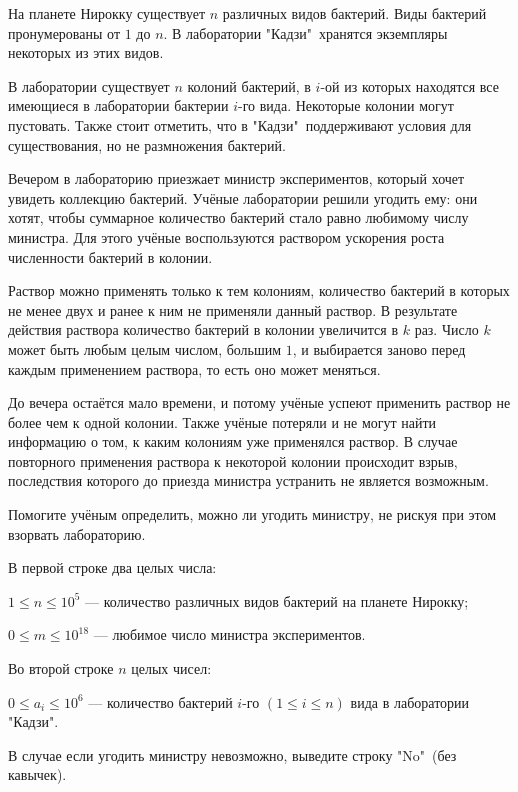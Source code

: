 
На планете Нирокку существует $n$ различных видов бактерий. Виды бактерий пронумерованы от $1$ до $n$. В лаборатории "Кадзи"\ хранятся экземпляры некоторых из этих видов.

В лаборатории существует $n$ колоний бактерий, в $i$-ой из которых находятся все имеющиеся в лаборатории бактерии $i$-го вида. Некоторые колонии могут пустовать. Также стоит отметить, что в "Кадзи"\ поддерживают условия для существования, но не размножения бактерий.

Вечером в лабораторию приезжает министр экспериментов, который хочет увидеть коллекцию бактерий. Учёные лаборатории решили угодить ему: они хотят, чтобы суммарное количество бактерий стало равно любимому числу министра. Для этого учёные воспользуются раствором ускорения роста численности бактерий в колонии.

Раствор можно применять только к тем колониям, количество бактерий в которых не менее двух и ранее к ним не применяли данный раствор. В результате действия раствора количество бактерий в колонии увеличится в $k$ раз. Число $k$ может быть любым целым числом, большим $1$, и выбирается заново перед каждым применением раствора, то есть оно может меняться.

До вечера остаётся мало времени, и потому учёные успеют применить раствор не более чем к одной колонии. Также учёные потеряли и не могут найти информацию о том, к каким колониям уже применялся раствор. В случае повторного применения раствора к некоторой колонии происходит взрыв, последствия которого до приезда министра устранить не является возможным.

Помогите учёным определить, можно ли угодить министру, не рискуя при этом взорвать лабораторию.


В первой строке два целых числа:

$1 \le n \le 10^5$ --- количество различных видов бактерий на планете Нирокку;

$0 \le m \le 10^{18}$ --- любимое число министра экспериментов.

Во второй строке $n$ целых чисел:

$0 \le a_{i} \le 10^6$ --- количество бактерий $i$-го $(1 \le i \le n)$ вида в лаборатории "Кадзи".

\outputfmtSection

В случае если угодить министру невозможно, выведите строку "No"\ (без кавычек).

